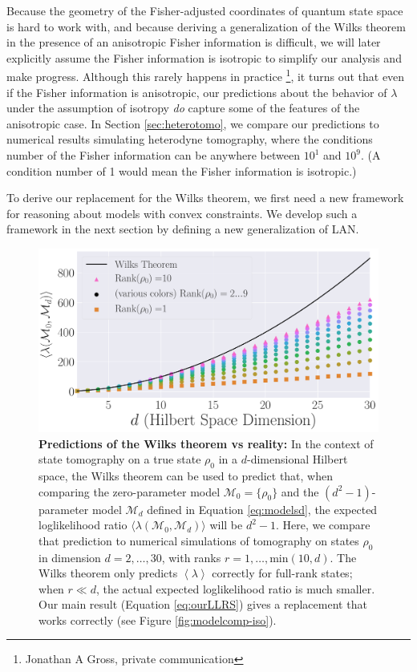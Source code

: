 \documentclass[aps,pra, twocolumn]{revtex4-1}
\newcommand{\M}{\mathcal{M}}
\newcommand{\expect}[1]{\ensuremath{\left\langle#1\right\rangle}}
\begin{document}
Because the geometry of the Fisher-adjusted coordinates of quantum state space is hard to work with, and because deriving a generalization of the Wilks theorem in the presence of an anisotropic Fisher information is difficult, we will later explicitly assume the Fisher information is isotropic to simplify our analysis and make progress. Although this rarely happens in practice \footnote{Jonathan A Gross, private communication}, it turns out that even if the Fisher information is anisotropic, our predictions about the behavior of $\lambda$ under the assumption of isotropy \emph{do} capture some of the features of the anisotropic case. In Section \ref{sec:heterotomo}, we compare our predictions to numerical results simulating heterodyne tomography, where the conditions number of the Fisher information can be anywhere between $10^{1}$ and $10^{9}$. (A condition number of 1 would mean the Fisher information is isotropic.)

To derive our replacement for the Wilks theorem, we first need a new framework for reasoning about models with convex constraints. We develop such a framework in the next section by defining a new generalization of LAN.

\begin{figure}
\includegraphics[width=\columnwidth]{Images/Figure_2.pdf}
 \caption{\textbf{Predictions of the Wilks theorem vs reality:}  In the context of state tomography on a true state $\rho_0$ in a $d$-dimensional Hilbert space, the Wilks theorem can be used to predict that, when comparing the zero-parameter model $\M_{0} = \{\rho_0\}$ and the $(d^2-1)$-parameter model $\mathcal{M}_d$ defined in Equation \eqref{eq:modelsd}, the expected loglikelihood ratio $\langle \lambda(\M_{0}, \M_{d})\rangle$ will be $d^2-1$.  Here, we compare that prediction to numerical simulations of tomography on states $\rho_0$ in dimension $d=2,\ldots,30$, with ranks $r=1,\ldots,\mathrm{min}(10,d)$.  The Wilks theorem only predicts $\expect{\lambda}$ correctly for full-rank states; when $r \ll d$, the actual expected loglikelihood ratio is much smaller. Our main result (Equation \ref{eq:ourLLRS}) gives a replacement that works correctly (see Figure \ref{fig:modelcomp-iso}).}
\label{fig:boundaries2}
\end{figure}
\end{document}
